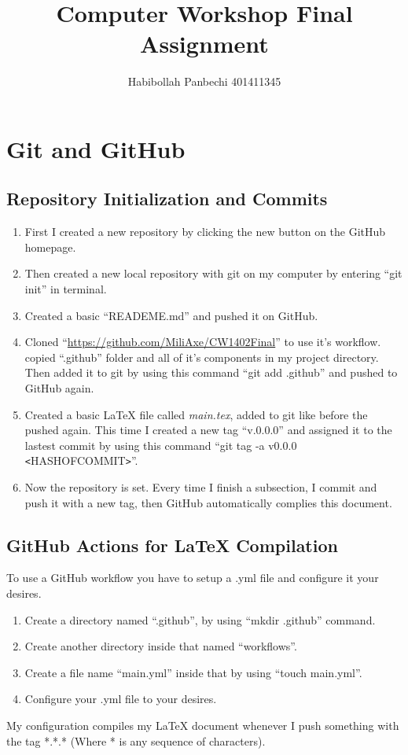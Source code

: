 \documentclass[12pt]{article}
\title{Computer Workshop Final Assignment}
\author{Habibollah Panbechi 401411345}
\begin{document}
\begin{titlepage}
    \maketitle
\end{titlepage}
\tableofcontents
\newpage

\section{Git and GitHub}

\subsection{Repository Initialization and Commits}
\begin{enumerate}
    \item First I created a new repository by clicking the new button on the GitHub homepage.
    \item Then created a new local repository with git on my computer by entering ``git init'' in terminal.
    \item Created a basic ``READEME.md'' and pushed it on GitHub.
    \item Cloned ``\href{https://github.com/MiliAxe/CW1402Final}{https://github.com/MiliAxe/CW1402Final}'' to use it's workflow. copied ``.github'' folder and all of it's components in my project directory. Then added it to git by using this command ``git add .github'' and pushed to GitHub again.
    \item Created a basic \LaTeX{} file called \emph{main.tex}, added to git like before the pushed again. This time I created a new tag ``v.0.0.0'' and assigned it to the lastest commit by using this command ``git tag -a v0.0.0 \verb|<|HASHOFCOMMIT\verb|>|''.
    \item Now the repository is set. Every time I finish a subsection, I commit and push it with a new tag, then GitHub automatically complies this document.
\end{enumerate}


\subsection{GitHub Actions for LaTeX Compilation}
To use a GitHub workflow you have to setup a .yml file and configure it your desires.
\begin{enumerate}
    \item Create a directory named ``.github'', by using ``mkdir .github'' command.
    \item Create another directory inside that named ``workflows''.
    \item Create a file name ``main.yml'' inside that by using ``touch main.yml''.
    \item Configure your .yml file to your desires.
\end{enumerate}
My configuration compiles my \LaTeX{} document whenever I push something with the tag *.*.* (Where * is any sequence of characters).
\end{document}
